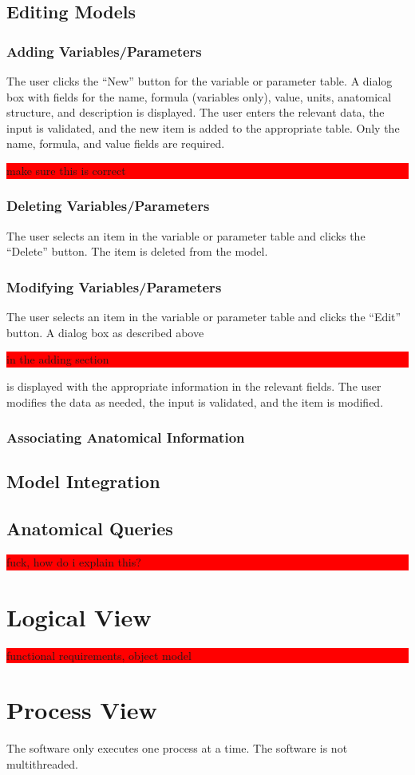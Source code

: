 \documentclass{article}
\newcommand{\todo}[1]{\colorbox{red}{\begin{minipage}{\textwidth}{#1}\end{minipage}}}
\begin{document}
\subsection{Editing Models}
\subsubsection{Adding Variables/Parameters}
The user clicks the ``New'' button for the variable or parameter table. A dialog box with fields for the name, formula (variables only), value, units, anatomical structure, and description is displayed. The user enters the relevant data, the input is validated, and the new item is added to the appropriate table. Only the name, formula, and value fields are required.
\todo{make sure this is correct}
\subsubsection{Deleting Variables/Parameters}
The user selects an item in the variable or parameter table and clicks the ``Delete'' button. The item is deleted from the model.
\subsubsection{Modifying Variables/Parameters}
The user selects an item in the variable or parameter table and clicks the ``Edit'' button. A dialog box as described above \todo{in the adding section} is displayed with the appropriate information in the relevant fields. The user modifies the data as needed, the input is validated, and the item is modified.
\subsubsection{Associating Anatomical Information}
\subsection{Model Integration}
\subsection{Anatomical Queries}
\todo{fuck, how do i explain this?}

\section{Logical View}
\todo{functional requirements, object model}

\section{Process View}
The software only executes one process at a time. The software is not multithreaded.
\end{document}
